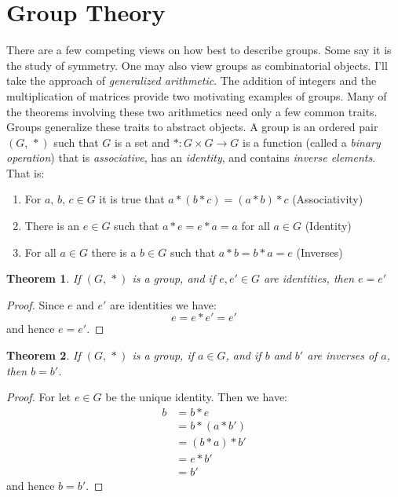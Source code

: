 \documentclass{article}
\theoremstyle{plain}
\newtheorem{theorem}{Theorem}[section]
\theoremstyle{normal}
\newenvironment{definition}{%
    \pushQED{\qed}\renewcommand{\qedsymbol}{$\blacksquare$}\definitionx%
}{%
    \popQED\enddefinitionx%
}
\begin{document}
    \section{Group Theory}
        There are a few competing views on how best to describe groups. Some
        say it is the study of symmetry. One may also view groups as
        combinatorial objects. I'll take the approach of
        \textit{generalized arithmetic}. The addition of integers and the
        multiplication of matrices provide two motivating examples of groups.
        Many of the theorems involving these two arithmetics need only a few
        common traits. Groups generalize these traits to abstract objects.
        \begin{definition}[(\textbf{Group})]
            A group is an ordered pair $(G,\,*)$ such that $G$ is a set and
            $*:G\times{G}\rightarrow{G}$ is a function (called a
            \textit{binary operation}) that is \textit{associative}, has an
            \textit{identity}, and contains \textit{inverse elements}. That is:
            \begin{enumerate}
                \item For $a,\,b,\,c\in{G}$ it is true that
                    $a*(b*c)=(a*b)*c$ (Associativity)
                \item There is an $e\in{G}$ such that $a*e=e*a=a$ for all
                    $a\in{G}$ (Identity)
                \item For all $a\in{G}$ there is a $b\in{G}$ such that
                    $a*b=b*a=e$ (Inverses)
            \end{enumerate}
        \end{definition}
        \begin{theorem}
            If $(G,\,*)$ is a group, and if $e,e'\in{G}$ are identities, then
            $e=e'$
        \end{theorem}
        \begin{proof}
            Since $e$ and $e'$ are identities we have:
            \begin{equation}
                e=e*e'=e'
            \end{equation}
            and hence $e=e'$.
        \end{proof}
        \begin{theorem}
            If $(G,\,*)$ is a group, if $a\in{G}$, and if $b$ and $b'$ are
            inverses of $a$, then $b=b'$.
        \end{theorem}
        \begin{proof}
            For let $e\in{G}$ be the unique identity. Then we have:
            \begin{align}
                b&=b*e\tag{Identity}\\
                &=b*(a*b')\tag{Inverse}\\
                &=(b*a)*b'\tag{Associativity}\\
                &=e*b'\tag{Inverse}\\
                &=b'\tag{Identity}
            \end{align}
            and hence $b=b'$.
        \end{proof}
\end{document}
